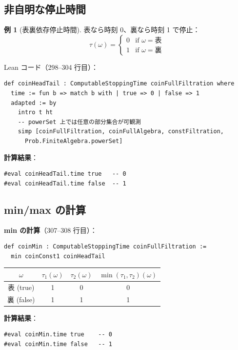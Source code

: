 \documentclass[12pt,a4paper,ja=standard]{bxjsarticle}
\theoremstyle{definition}
\newtheorem{example}[definition]{例}
\begin{document}
\subsection{非自明な停止時間}

\begin{example}[表裏依存停止時間]
表なら時刻 0、裏なら時刻 1 で停止：
\[
\tau(\omega) = \begin{cases}
0 & \text{if } \omega = \text{表} \\
1 & \text{if } \omega = \text{裏}
\end{cases}
\]

Lean コード（298--304 行目）：
\begin{verbatim}
def coinHeadTail : ComputableStoppingTime coinFullFiltration where
  time := fun b => match b with | true => 0 | false => 1
  adapted := by
    intro t ht
    -- powerSet 上では任意の部分集合が可観測
    simp [coinFullFiltration, coinFullAlgebra, constFiltration,
      Prob.FiniteAlgebra.powerSet]
\end{verbatim}

\textbf{計算結果}：
\begin{verbatim}
#eval coinHeadTail.time true   -- 0
#eval coinHeadTail.time false  -- 1
\end{verbatim}
\end{example}

\subsection{min/max の計算}

\begin{computation}
\textbf{min の計算}（307--308 行目）：
\begin{verbatim}
def coinMin : ComputableStoppingTime coinFullFiltration :=
  min coinConst1 coinHeadTail
\end{verbatim}

\begin{center}
\begin{tabular}{|c|c|c|c|}
\hline
$\omega$ & $\tau_1(\omega)$ & $\tau_2(\omega)$ & $\min(\tau_1, \tau_2)(\omega)$ \\
\hline
表 (true) & 1 & 0 & 0 \\
裏 (false) & 1 & 1 & 1 \\
\hline
\end{tabular}
\end{center}

\textbf{計算結果}：
\begin{verbatim}
#eval coinMin.time true    -- 0
#eval coinMin.time false   -- 1
\end{verbatim}
\end{computation}
\end{document}
